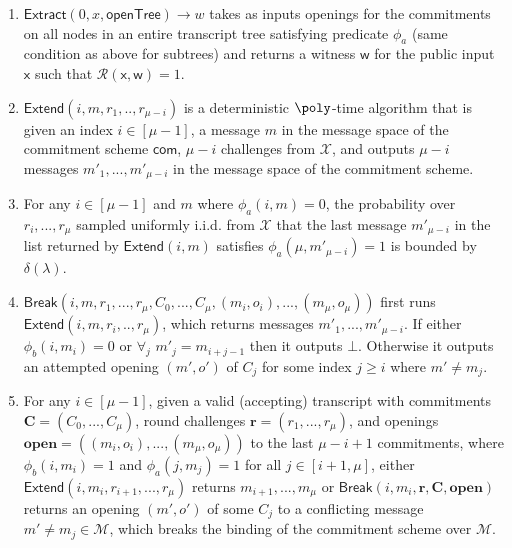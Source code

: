 \begin{definition}
\begin{enumerate}
\item  $\textsf{Extract}(0,x,\textsf{openTree}) \rightarrow w$ takes as inputs openings for the commitments on all nodes in an entire transcript tree satisfying predicate $\phi_a$ (same condition as above for subtrees) and returns a witness $\mathsf{w}$ for the public input $\mathsf{x}$ such that $\mathcal{R}(\mathsf{x},\mathsf{w})=1$. 

\item  $\textsf{Extend}(i, m, r_1,..,r_{\mu-i})$ is a deterministic $\poly$-time algorithm that is given an index $i \in [\mu-1]$, a message $m$ in the message space of the commitment scheme $\textsf{com}$, $\mu-i$ challenges from $\mathcal{X}$, and outputs $\mu-i$ messages $m'_1,...,m'_{\mu-i}$ in the message space of the commitment scheme. 
\item For any $i \in [\mu-1]$ and $m$ where $\phi_a(i,m) = 0$, the probability over $r_i,...,r_\mu$ sampled uniformly i.i.d. from $\mathcal{X}$ that the last message $m'_{\mu-i}$ in the list returned by $\textsf{Extend}(i, m)$ satisfies $\phi_a(\mu, m'_{\mu-i}) = 1$ is bounded by $\delta(\lambda)$.   

\item $\textsf{Break}(i, m, r_1,...,r_\mu, C_0,...,C_\mu, (m_i, o_i),...,(m_{\mu}, o_{\mu}))$ first runs $\textsf{Extend}(i, m, r_i,..,r_{\mu})$, which returns messages $m'_1,...,m'_{\mu-i}$. If  either $\phi_b(i, m_i) = 0$ or $\forall_j$ $m'_j = m_{i + j -1}$ then it outputs $\bot$. Otherwise it outputs an attempted opening $(m', o')$ of $C_j$ for some index $j \geq i$ where $m' \neq m_j$. %



\item For any $i \in [\mu-1]$, given a valid (accepting) transcript with commitments $\mathbf{C} = (C_0,...,C_\mu)$, round challenges $\mathbf{r} = (r_1,...,r_{\mu})$, and openings $\mathbf{open} = ((m_{i},o_{i}),...,(m_\mu, o_\mu))$ to the last $\mu-i+1$ commitments, where $\phi_b(i, m_i) = 1$ and $\phi_a(j, m_j) = 1$ for all $j \in [i+1,\mu]$, either $\textsf{Extend}(i, m_i, r_{i+1},...,r_\mu)$ returns $m_{i+1},...,m_{\mu}$ or $\textsf{Break}(i, m_i, \mathbf{r}, \mathbf{C}, \mathbf{open})$ returns an opening $(m', o')$ of some $C_j$ to a conflicting message $m' \neq m_j \in \mathcal{M}$, which breaks the binding of the commitment scheme over $\mathcal{M}$.
\end{enumerate} 


\end{definition}
